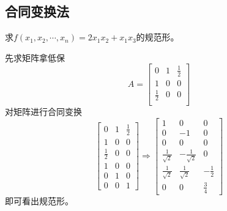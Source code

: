 \documentclass[lang=cn,10pt]{elegantbook}
\begin{document}
\subsection{合同变换法}
\begin{example}
	求$f(x_{1},x_{2},\cdots,x_{n})=2x_{1}x_{2}+x_{1}x_{3}$的规范形。
\end{example}
\begin{solution}
	
	先求矩阵拿低保
	\begin{equation*}
		A=\left[ \begin{matrix}
			0&		1&		\frac{1}{2}\\
			1&		0&		0\\
			\frac{1}{2}&		0&		0\\
		\end{matrix} \right] 
	\end{equation*}
	对矩阵进行合同变换
	\begin{equation*}
		\begin{bmatrix}
			0&		1&		\frac{1}{2}\\
			1&		0&		0\\
			\frac{1}{2}&		0&		0\\
			1&0  & 0\\
			0& 1 &0 \\
			0 & 0 &1
		\end{bmatrix}\Longrightarrow \begin{bmatrix}
			1& 0 &0 \\
			0&-1  &0 \\
			0&0  &0 \\
			\frac{1}{\sqrt{2} } &-\frac{1}{\sqrt{2} }  & 0\\
			\frac{1}{\sqrt{2} }& \frac{1}{\sqrt{2} }&-\frac{1}{2 }\\
			0 & 0 &\frac{3}{4 }
		\end{bmatrix}
	\end{equation*}
	即可看出规范形。
\end{solution}
\end{document}
